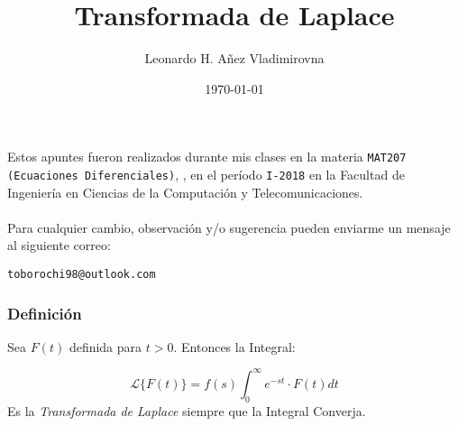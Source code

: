 

\title{Transformada de Laplace}

\author{Leonardo H. Añez Vladimirovna}
\date{\today}

\maketitle

Estos apuntes fueron realizados durante mis clases en la materia \texttt{MAT207 (Ecuaciones Diferenciales)}, , en el período \texttt{I-2018} en la Facultad de Ingeniería en Ciencias de la Computación y Telecomunicaciones. 
\\ \vspace{0.5cm} \\
Para cualquier cambio, observación y/o sugerencia pueden enviarme un mensaje al siguiente correo:
\begin{center}
 \texttt{toborochi98@outlook.com}
\end{center}

\subsubsection*{Definición} Sea $F(t)$ definida para $t>0$. Entonces la Integral:

$$\mathscr{L} \lbrace F(t)\rbrace = f(s) \displaystyle\int_{0}^{\infty} e^{-st}\cdot F(t) dt$$
Es la \textit{Transformada de Laplace} siempre que la Integral Converja.